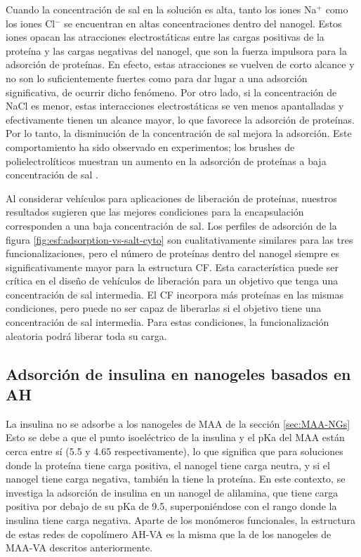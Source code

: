 Cuando la concentraci\'on de sal en la soluci\'on es alta, tanto los iones Na$^+$ como los iones Cl$^-$ se encuentran en altas concentraciones dentro del nanogel.
Estos iones opacan las atracciones electrost\'aticas entre las cargas positivas de la prote\'ina y las cargas negativas del nanogel, que son la fuerza impulsora para la adsorci\'on de prote\'inas.
En efecto, estas atracciones se vuelven de corto alcance y no son lo suficientemente fuertes como para dar lugar a una adsorci\'on significativa, de ocurrir dicho fen\'omeno.
Por otro lado, si la concentraci\'on de NaCl es menor, estas interacciones electrost\'aticas se ven menos apantalladas y efectivamente tienen un alcance mayor, lo que favorece la adsorci\'on de prote\'inas.
Por lo tanto, la disminuci\'on de la concentraci\'on de sal mejora la adsorci\'on.
Este comportamiento ha sido observado en experimentos; los brushes  de  polielectrol\'iticos muestran un aumento en la adsorci\'on de prote\'inas a baja concentraci\'on de sal \cite{wittemann2006interaction,becker2012proteins, henzler2010adsorption,xu2018interaction}.

Al considerar veh\'iculos para aplicaciones de liberaci\'on de prote\'inas, nuestros resultados sugieren que las mejores condiciones para la encapsulaci\'on corresponden a una baja concentraci\'on de sal.
Los perfiles de adsorci\'on de la figura \ref{fig:esf:adsorption-vs-salt-cyto} son cualitativamente similares para las tres funcionalizaciones, pero el n\'umero de prote\'inas dentro del nanogel siempre es significativamente mayor para la estructura CF.
Esta caracter\'istica puede ser cr\'itica en el dise\~no de veh\'iculos de liberaci\'on para un objetivo que tenga una concentraci\'on de sal intermedia.
El CF incorpora m\'as prote\'inas en las mismas condiciones, pero puede no ser capaz de liberarlas si el objetivo tiene una concentraci\'on de sal intermedia.
Para estas condiciones, la funcionalizaci\'on aleatoria podr\'a liberar toda su carga.



\subsection{Adsorci\'on de insulina en nanogeles basados en  AH} 

La insulina no se adsorbe a los nanogeles de MAA de la secci\'on \ref{sec:MAA-NGs} %
Esto se debe a que el punto isoel\'ectrico de la insulina y el pKa del MAA est\'an cerca entre s\'i (5.5 y 4.65 respectivamente), lo que significa que para soluciones donde la prote\'ina tiene carga positiva, el nanogel tiene carga neutra, y si el nanogel tiene carga negativa, tambi\'en la tiene la prote\'ina.
En este contexto, se investiga la adsorci\'on de insulina en un nanogel de alilamina, que tiene carga positiva por debajo de su pKa de 9.5, superponi\'endose con el rango donde la insulina tiene carga negativa.
Aparte de los mon\'omeros funcionales, la estructura de estas redes de copol\'imero AH-VA es la misma que la de los nanogeles de MAA-VA descritos anteriormente.


